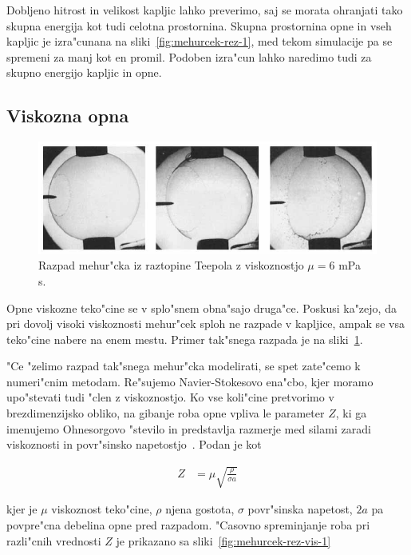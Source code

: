\documentclass[a4paper,12pt]{article}
\begin{document}
Dobljeno hitrost in velikost kapljic lahko preverimo, saj se morata ohranjati tako skupna energija kot tudi celotna prostornina. Skupna prostornina opne in vseh kapljic je izra"cunana na sliki~\ref{fig:mehurcek-rez-1}, med tekom simulacije pa se spremeni za manj kot en promil. Podoben izra"cun lahko naredimo tudi za skupno energijo kapljic in opne.

\subsection{Viskozna opna}
\begin{figure}[h]
  \centering
\includegraphics[width=.9\textwidth]{./Slike/meh-vis-1}
\caption{Razpad mehur"cka iz raztopine Teepola z viskoznostjo $\mu = 6$ mPa s.~\cite{pandit}}
\label{fig:mehurcek-viskozni-razpad}
\end{figure}

Opne viskozne teko"cine se v splo"snem obna"sajo druga"ce. Poskusi ka"zejo, da pri dovolj visoki viskoznosti mehur"cek sploh ne razpade v kapljice, ampak se vsa teko"cine nabere na enem mestu. Primer tak"snega razpada je na sliki~\ref{fig:mehurcek-viskozni-razpad}. 

"Ce "zelimo razpad tak"snega mehur"cka modelirati, se spet zate"cemo k numeri"cnim metodam. Re"sujemo Navier-Stokesovo ena"cbo, kjer moramo upo"stevati tudi "clen z viskoznostjo. Ko vse koli"cine pretvorimo v brezdimenzijsko obliko, na gibanje roba opne vpliva le parameter $Z$, ki ga imenujemo Ohnesorgovo "stevilo in predstavlja razmerje med silami zaradi viskoznosti in povr"sinsko napetostjo~\cite{scat}. Podan je kot

\begin{align}
Z &= \mu\sqrt{\frac{\rho}{\sigma a}} 
\end{align}

kjer je $\mu$ viskoznost teko"cine, $\rho$ njena gostota, $\sigma$ povr"sinska napetost, $2a$ pa povpre"cna debelina opne pred razpadom. "Casovno spreminjanje roba pri razli"cnih vrednosti $Z$ je prikazano sa sliki~\ref{fig:mehurcek-rez-vis-1}
\end{document}

